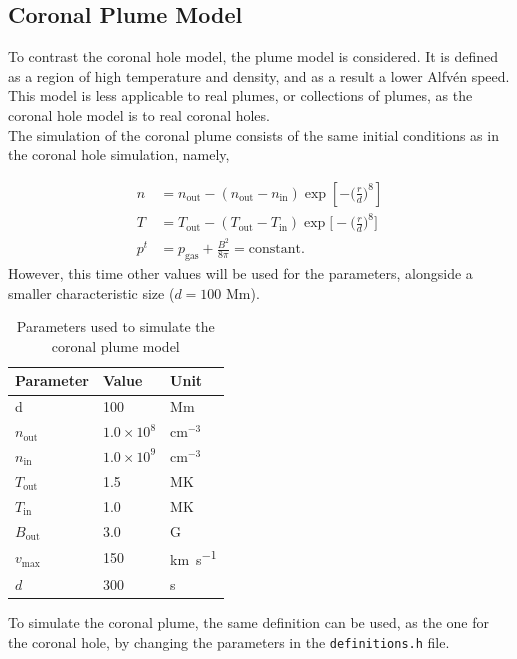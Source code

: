 \documentclass[a4paper]{article}
\numberwithin{figure}{section}
\numberwithin{equation}{section}
\begin{document}
\subsection{Coronal Plume Model}\label{sec:coronal_plume_model} 
To contrast the coronal hole model, the plume model is considered. 
It is defined as a region of high temperature and density, and as a result a lower Alfv\'en speed.
This model is less applicable to real plumes, or collections of plumes, as the coronal hole model is to real coronal holes.\\

The simulation of the coronal plume consists of the same initial conditions as in the coronal hole simulation, namely,

\begin{align*}
    n &= n_{\text{out}} - (n_{\text{out}}-n_{\text{in}})\exp\left[-\bigg(\frac{r}{d}\bigg)^8\right]\\
    T &= T_{\text{out}} - (T_{\text{out}}-T_{\text{in}})\exp\bigg[-\bigg(\frac{r}{d}\bigg)^8\bigg]\\
     p^t &= p_{\text{gas}} + \frac{B^2}{8\pi} = \text{constant}.
\end{align*}
However, this time other values will be used for the parameters, alongside a smaller characteristic size ($d = 100$ Mm).
\begin{table}[H]
    \centering
    \caption{Parameters used to simulate the coronal plume model}
    \label{tab:coronal_plume}
    \begin{tabular}{|l|l|l|}
    \hline
    \textbf{Parameter}             & \textbf{Value}                                  & \textbf{Unit}              \\ \hline
    d                              & 100                                             & Mm                         \\ \hline
    $n_\text{out}$ & $1.0 \times 10^8$ & $\text{cm}^{-3}$ \\ \hline
    $n_\text{in}$                              & $1.0 \times 10^9$                                               & $\text{cm}^{-3}$                          \\ \hline
    $T_\text{out}$                              & 1.5                                               & MK                          \\ \hline
    $T_\text{in}$                              & 1.0                                               & MK                          \\ \hline
    $B_\text{out}$                              & 3.0                                               & G                          \\ \hline
    $v_\text{max}$ 			 	& 150						& \si{\kilo\metre \per \second}  \\ \hline
    $d$						& 300						& \si{\second} \\ \hline
\end{tabular}
\end{table}
To simulate the coronal plume, the same definition can be used, as the one for the coronal hole, by changing the parameters in the \texttt{definitions.h} file.\\
\end{document}

